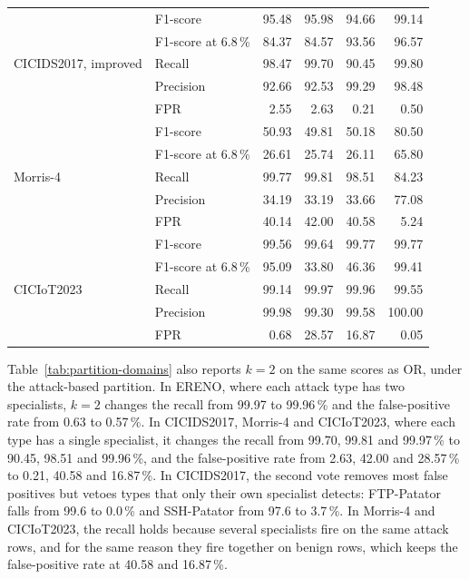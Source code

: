 \begin{table}[htbp]
\begin{tabular}{@{}llrrrr@{}}
\midrule
\multirow{5}{*}{CICIDS2017, improved}
 & F1-score         & 95.48 & 95.98 & 94.66 & 99.14 \\
 & F1-score at 6.8\,\% & 84.37 & 84.57 & 93.56 & 96.57 \\
 & Recall           & 98.47 & 99.70 & 90.45 & 99.80 \\
 & Precision        & 92.66 & 92.53 & 99.29 & 98.48 \\
 & FPR              &  2.55 &  2.63 &  0.21 &  0.50 \\
\midrule
\multirow{5}{*}{Morris-4}
 & F1-score         & 50.93 & 49.81 & 50.18 & 80.50 \\
 & F1-score at 6.8\,\% & 26.61 & 25.74 & 26.11 & 65.80 \\
 & Recall           & 99.77 & 99.81 & 98.51 & 84.23 \\
 & Precision        & 34.19 & 33.19 & 33.66 & 77.08 \\
 & FPR              & 40.14 & 42.00 & 40.58 &  5.24 \\
\midrule
\multirow{5}{*}{CICIoT2023}
 & F1-score         & 99.56 & 99.64 & 99.77 & 99.77 \\
 & F1-score at 6.8\,\% & 95.09 & 33.80 & 46.36 & 99.41 \\
 & Recall           & 99.14 & 99.97 & 99.96 & 99.55 \\
 & Precision        & 99.98 & 99.30 & 99.58 & 100.00 \\
 & FPR              &  0.68 & 28.57 & 16.87 &  0.05 \\
\bottomrule
\end{tabular}
\end{table}

Table~\ref{tab:partition-domains} also reports $k = 2$ on the same scores as OR, under the attack-based partition. In ERENO, where each attack type has two specialists, $k = 2$ changes the recall from 99.97 to 99.96\,\% and the false-positive rate from 0.63 to 0.57\,\%. In CICIDS2017, Morris-4 and CICIoT2023, where each type has a single specialist, it changes the recall from 99.70, 99.81 and 99.97\,\% to 90.45, 98.51 and 99.96\,\%, and the false-positive rate from 2.63, 42.00 and 28.57\,\% to 0.21, 40.58 and 16.87\,\%. In CICIDS2017, the second vote removes most false positives but vetoes types that only their own specialist detects: FTP-Patator falls from 99.6 to 0.0\,\% and SSH-Patator from 97.6 to 3.7\,\%. In Morris-4 and CICIoT2023, the recall holds because several specialists fire on the same attack rows, and for the same reason they fire together on benign rows, which keeps the false-positive rate at 40.58 and 16.87\,\%.

